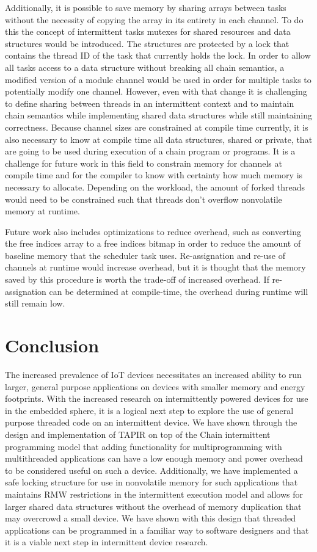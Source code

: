 \documentclass[11pt]{sensys-proc}
\begin{document}
Additionally, it is possible to save memory by sharing arrays between tasks
without the necessity of copying the array in its entirety in each channel.  To
do this the concept of intermittent tasks mutexes for shared resources and data
structures would be introduced.  The structures are protected by a lock that
contains the thread ID of the task that currently holds the lock.  In order to
allow all tasks access to a data structure without breaking all chain semantics,
a modified version of a module channel would be used in order for multiple tasks
to potentially modify one channel.  However, even with that change it is
challenging to define sharing between threads in an intermittent context and to
maintain chain semantics while implementing shared data structures while still
maintaining correctness.  Because channel sizes are constrained at compile time
currently, it is also necessary to know at compile time all data structures,
shared or private, that are going to be used during execution of a chain program
or programs.  It is a challenge for future work in this field to constrain
memory for channels at compile time and for the compiler to know with certainty
how much memory is necessary to allocate. Depending on the workload, the amount
of forked threads would need to be constrained such that threads don't overflow
nonvolatile memory at runtime.

Future work also includes optimizations to reduce overhead, such as converting
the free indices array to a free indices bitmap in order to reduce the amount of
baseline memory that the scheduler task uses.  Re-assignation and re-use of
channels at runtime would increase overhead, but it is thought that the memory
saved by this procedure is worth the trade-off of increased overhead.  If
re-assignation can be determined at compile-time, the overhead during runtime
will still remain low.

\section{Conclusion}
The increased prevalence of IoT devices necessitates an increased ability to
run larger, general purpose applications on devices with smaller memory and
energy footprints. With the increased research on intermittently powered devices
for use in the embedded sphere, it is a logical next step to explore the use
of general purpose threaded code on an intermittent device. We have shown
through the design and implementation of TAPIR on top of the Chain intermittent
programming model that adding functionality for multiprogramming with
multithreaded applications can have a low enough memory and power overhead to be
considered useful on such a device. Additionally, we have implemented a safe
locking structure for use in nonvolatile memory for such applications that
maintains RMW restrictions in the intermittent execution model and allows
for larger shared data structures without the overhead of memory duplication
that may overcrowd a small device. We have shown with this design that threaded
applications can be programmed in a familiar way to software designers and that
it is a viable next step in intermittent device research.
\end{document}
